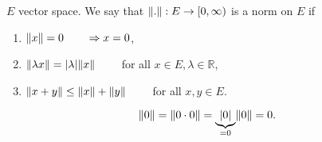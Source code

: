 \begin{definition*}[norm]
	$E$ vector space. We say that $\norm{.}: E \to [0,\infty)$ is a norm on $E$ if
	\begin{enumerate}[1)]
		\item $\norm{x}=0 \qquad \Rightarrow x =0$,
		\item $\norm{\lambda x} = \abs{\lambda} \norm{x} \qquad $ for all $x \in E, \lambda \in \mathbb{R}$,
		\item $\norm{x+y} \leq \norm{x} + \norm{y} \qquad $ for all $x,y \in E$.
	\end{enumerate}
	
\end{definition*}
\begin{bemerkung}
	\[
		\norm{0} = \norm{0 \cdot 0} = \underset{=0}{\underbrace{\abs{0}}} \norm{0} = 0.
	\]
\end{bemerkung}
